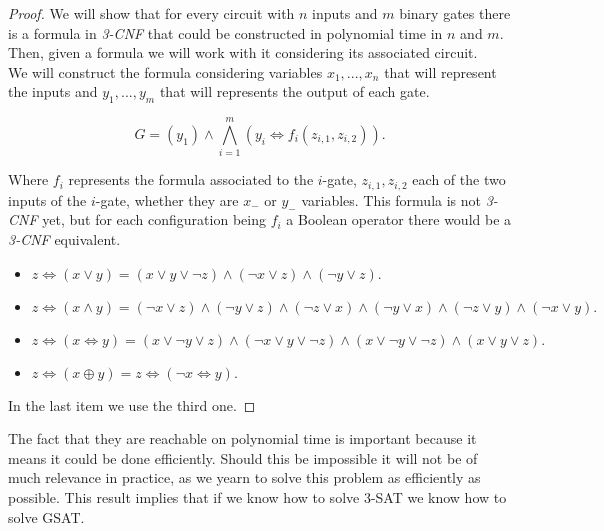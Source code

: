   \begin{proof}
    We will show that for every circuit with $n$ inputs and $m$ binary gates there is a formula in \emph{3-CNF}  that could be constructed in polynomial time in $n$ and $m$. Then, given a formula we will work with it considering its associated circuit.\\
    
    We will construct the formula considering variables $x_1,...,x_n$ that will represent the inputs and $y_1,...,y_m$ that will represents the output of each gate. 

    $$ G = (y_1) \wedge \bigwedge_{i=1}^m (y_i \iff f_i(z_{i,1},z_{i,2})).$$

    Where $f_i$ represents the formula associated to the $i$-gate, $z_{i,1},z_{i,2}$ each of the two inputs of the $i$-gate, whether they are $x_-$ or $y_-$ variables. This formula is not \emph{3-CNF} yet, but for each configuration being $f_i$ a Boolean operator there would be a \emph{3-CNF} equivalent.

    \begin{itemize}
    \item $z \iff( x \vee y )= ( x \lor y \lor \neg z) \land (\neg x \lor z) \land (\neg y \lor z).$
    \item $z\iff( x \wedge y ) =   (\neg  x \vee z) \wedge (\neg  y \vee z ) \wedge (\neg  z \vee x ) \wedge (\neg  y \vee x ) \wedge(\neg  z\vee y )\wedge (\neg  x\vee y ).$
      
    \item $
z\! \iff\!( x\! \iff\! y )\! =\! (x\! \lor\!  \neg y \lor\! z) \land\! (\neg x\! \lor\! y\! \lor\! \neg z) \!\land\! (x\! \lor\! \neg y\! \lor\! \neg z)\! \land\! (x \lor y \lor z).$



      
    \item $z \iff( x \oplus y ) =  z \iff(\neg  x \iff y ) . $	

    \end{itemize}
    In the last item we use the third one.
    
  \end{proof}

  The fact that they are reachable on polynomial time is important because it means it could be done efficiently. Should this be impossible it will not be of much relevance in practice, as we yearn to solve this problem as efficiently as possible. This result implies that if we know how to solve $3$-SAT we know how to solve GSAT.


